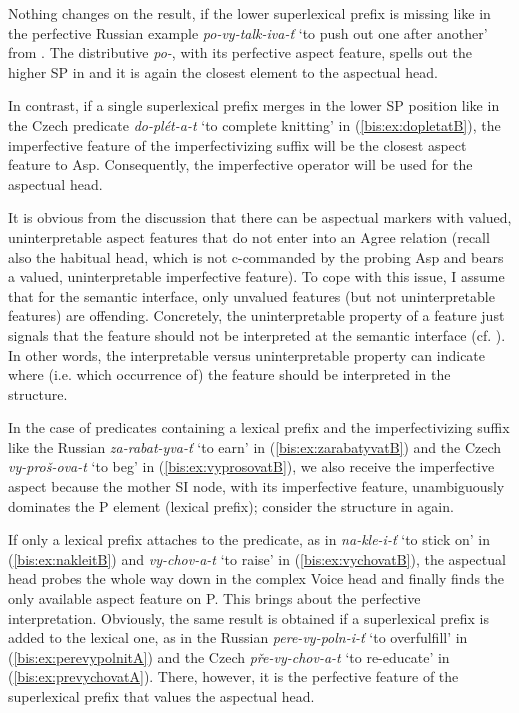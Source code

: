 \documentclass[output=paper]{langscibook}
\begin{document}
Nothing changes on the result, if the lower superlexical prefix is missing like in the perfective Russian example \textit{po-vy-talk-iva-ť} ‘to push out one after another’ from . The distributive \textit{po-}, with its perfective aspect feature, spells out the higher SP in  and it is again the closest element to the aspectual head.

In contrast, if a single superlexical prefix merges in the lower SP position like in the Czech predicate \textit{do-plét-a-t} ‘to complete knitting’ in (\ref{bis:ex:dopletatB}), the imperfective feature of the imperfectivizing suffix will be the closest aspect feature to Asp. Consequently, the imperfective operator will be used for the aspectual head.

It is obvious from the discussion that there can be aspectual markers with valued, uninterpretable aspect features that do not enter into an Agree relation (recall also the habitual head, which is not c-commanded by the probing Asp and bears a valued, uninterpretable imperfective feature). To cope with this issue, I assume that for the semantic interface, only unvalued features (but not uninterpretable features) are offending. Concretely, the uninterpretable property of a feature just signals that the feature should not be interpreted at the semantic interface (cf. \citealt{Zeijlstra2009}). In other words, the interpretable versus uninterpretable property can indicate where (i.e. which occurrence of) the feature should be interpreted in the structure.

In the case of predicates containing a lexical prefix and the imperfectivizing suffix like the Russian \textit{za-rabat-yva-ť} ‘to earn’ in (\ref{bis:ex:zarabatyvatB}) and the Czech \textit{vy-proš-ova-t} ‘to beg’ in (\ref{bis:ex:vyprosovatB}), we also receive the imperfective aspect because the mother SI node, with its imperfective feature, unambiguously dominates the P element (lexical prefix); consider the structure in  again.

If only a lexical prefix attaches to the predicate, as in \textit{na-kle-i-ť} ‘to stick on’ in (\ref{bis:ex:nakleitB}) and \textit{vy-chov-a-t} ‘to raise’ in (\ref{bis:ex:vychovatB}), the aspectual head probes the whole way down in the complex Voice head and finally finds the only available aspect feature on P. This brings about the perfective interpretation. Obviously, the same result is obtained if a superlexical prefix is added to the lexical one, as in the Russian \textit{pere-vy-poln-i-ť} ‘to overfulfill’ in (\ref{bis:ex:perevypolnitA}) and the Czech \textit{pře-vy-chov-a-t} ‘to re-educate’ in (\ref{bis:ex:prevychovatA}). There, however, it is the perfective feature of the superlexical prefix that values the aspectual head.
\end{document}

